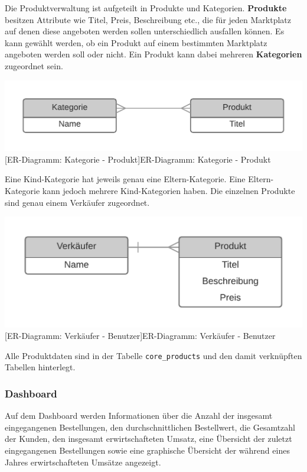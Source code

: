 	Die Produktverwaltung ist aufgeteilt in Produkte und Kategorien. \textbf{Produkte} besitzen Attribute wie Titel, Preis, Beschreibung etc., die für jeden Marktplatz auf denen diese angeboten werden sollen unterschiedlich ausfallen können. Es kann gewählt werden, ob ein Produkt auf einem bestimmten Marktplatz angeboten werden soll oder nicht. Ein Produkt kann dabei mehreren \textbf{Kategorien} zugeordnet sein.\\
	\begin{minipage}{\linewidth}
		\vspace{1em}
		\centering
		\includegraphics[width=0.6\linewidth]{img/ERD_Category_Product}
		[ER-Diagramm: Kategorie - Produkt]{ER-Diagramm: Kategorie - Produkt}
		\label{fig:header}
		\vspace{1em}
	\end{minipage}
	Eine Kind-Kategorie hat jeweils genau eine Eltern-Kategorie. Eine Eltern-Kategorie kann jedoch mehrere Kind-Kategorien haben. Die einzelnen Produkte sind genau einem Verkäufer zugeordnet. \\
	\begin{minipage}{\linewidth}
		\vspace{1em}
		\centering
		\includegraphics[width=0.6\linewidth]{img/ERD_Seller_Product}
		[ER-Diagramm: Verkäufer - Benutzer]{ER-Diagramm: Verkäufer - Benutzer}
		\label{fig:header}
		\vspace{1em}
	\end{minipage}
	
	Alle Produktdaten sind in der Tabelle \texttt{core\_products} und den damit verknüpften Tabellen hinterlegt.
	
	\subsubsection{Dashboard}
	
	Auf dem Dashboard werden Informationen über die Anzahl der insgesamt eingegangenen Bestellungen, den durchschnittlichen Bestellwert, die Gesamtzahl der Kunden, den insgesamt erwirtschafteten Umsatz, eine Übersicht der zuletzt eingegangenen Bestellungen sowie eine graphische Übersicht der während eines Jahres erwirtschafteten Umsätze angezeigt. 
	
